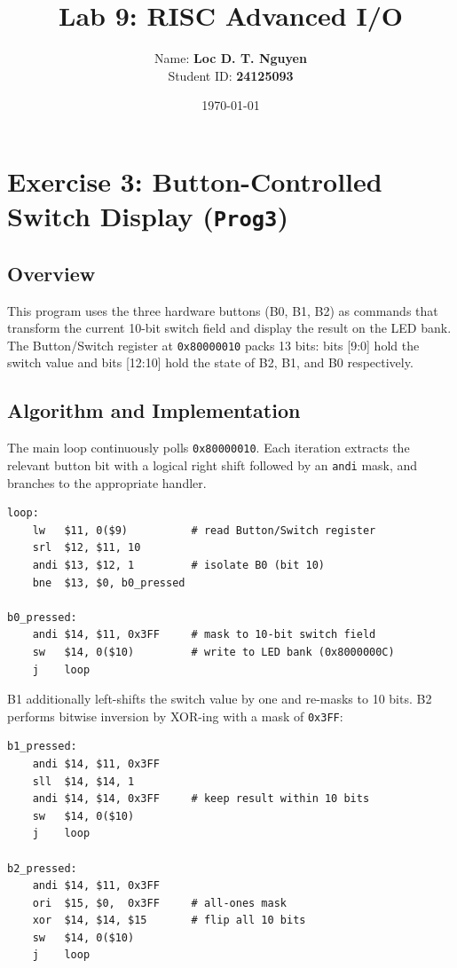 \documentclass[12pt,a4paper]{article}
\title{Lab 9: RISC Advanced I/O}
\author{Name: \textbf{Loc D. T. Nguyen} \\ Student ID: \textbf{24125093}}
\date{\today}
\begin{document}
\maketitle

\section{Exercise 3: Button-Controlled Switch Display (\texttt{Prog3})}

\subsection{Overview}
This program uses the three hardware buttons (B0, B1, B2) as commands that transform the current 10-bit switch field and display the result on the LED bank. The Button/Switch register at \texttt{0x80000010} packs 13 bits: bits [9:0] hold the switch value and bits [12:10] hold the state of B2, B1, and B0 respectively.

\subsection{Algorithm and Implementation}
The main loop continuously polls \texttt{0x80000010}. Each iteration extracts the relevant button bit with a logical right shift followed by an \texttt{andi} mask, and branches to the appropriate handler.

\begin{lstlisting}[style=mips, caption={Button Detection and Raw Display (B0 handler)}]
loop:
    lw   $11, 0($9)          # read Button/Switch register
    srl  $12, $11, 10
    andi $13, $12, 1         # isolate B0 (bit 10)
    bne  $13, $0, b0_pressed

b0_pressed:
    andi $14, $11, 0x3FF     # mask to 10-bit switch field
    sw   $14, 0($10)         # write to LED bank (0x8000000C)
    j    loop
\end{lstlisting}

B1 additionally left-shifts the switch value by one and re-masks to 10 bits. B2 performs bitwise inversion by XOR-ing with a mask of \texttt{0x3FF}:

\begin{lstlisting}[style=mips, caption={Shift and Invert Handlers (B1 and B2)}]
b1_pressed:
    andi $14, $11, 0x3FF
    sll  $14, $14, 1
    andi $14, $14, 0x3FF     # keep result within 10 bits
    sw   $14, 0($10)
    j    loop

b2_pressed:
    andi $14, $11, 0x3FF
    ori  $15, $0,  0x3FF     # all-ones mask
    xor  $14, $14, $15       # flip all 10 bits
    sw   $14, 0($10)
    j    loop
\end{lstlisting}
\end{document}
